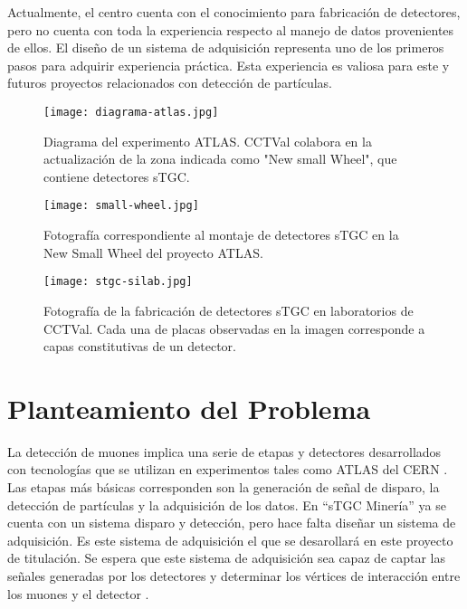 	Actualmente, el centro  cuenta con el conocimiento para fabricación de detectores, pero no cuenta con toda la experiencia respecto al manejo de datos provenientes de ellos. El diseño de un sistema de adquisición representa uno de los primeros pasos para adquirir experiencia práctica. Esta experiencia es  valiosa para este y futuros proyectos relacionados con detección de partículas.
	
	
	\begin{figure}[h]
		\centering
		\texttt{[image: diagrama-atlas.jpg]}
		\caption{Diagrama del experimento ATLAS. CCTVal colabora en la actualización de la zona indicada como "New small Wheel", que contiene detectores sTGC.}
		\label{img:diagrama-atlas}
	\end{figure}

	\begin{figure}[h]
		\centering
		\texttt{[image: small-wheel.jpg]}
		\caption{Fotografía correspondiente al montaje de detectores sTGC en la New Small Wheel del proyecto ATLAS.}
		\label{img:small-wheel}
	\end{figure}
	
	\begin{figure}[h]
		\centering
		\texttt{[image: stgc-silab.jpg]}
		\caption{Fotografía de la fabricación de detectores sTGC en laboratorios de CCTVal. Cada una de placas observadas en la imagen corresponde a capas constitutivas de un detector.}
		\label{img:stgc-silab}
	\end{figure}
	
	
%	

\section{Planteamiento del Problema}
\label{sec:planteamiento}
	La detección de muones implica una serie de etapas y detectores desarrollados con tecnologías que se utilizan en experimentos tales como ATLAS del CERN . Las etapas más básicas  corresponden son  la generación de señal de disparo, la detección de partículas y la adquisición de los datos. En ``sTGC Minería'' ya se cuenta con un sistema disparo y detección, pero hace falta diseñar un sistema de adquisición. Es este sistema de adquisición el que se desarollará en este proyecto de titulación. Se espera que este sistema de adquisición sea capaz de captar las señales generadas por los detectores y determinar los vértices de interacción entre los muones y el detector . 
	
